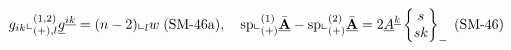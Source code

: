 \documentclass[preview]{standalone}
\begin{document}
\begin{align*}
\special{dvisvgm:raw <g id='unique000'>}g_{ik}\llcorner_{(+),l}^{(1,2)}\underline{g}^{\underline{ik}} = (n-2)\llcorner_l w\;(\text{SM-46a}),\quad \operatorname{sp}\llcorner_{(+)}^{(1)}\underline{\bar{\mathbf{A}}} - \operatorname{sp}\llcorner_{(+)}^{(2)}\underline{\bar{\mathbf{A}}} = 2\underline{A}^{\underline{k}}\begin{Bmatrix}s\\sk\end{Bmatrix}_-\;(\text{SM-46})\special{dvisvgm:raw </g>}
\end{align*}
\end{document}
